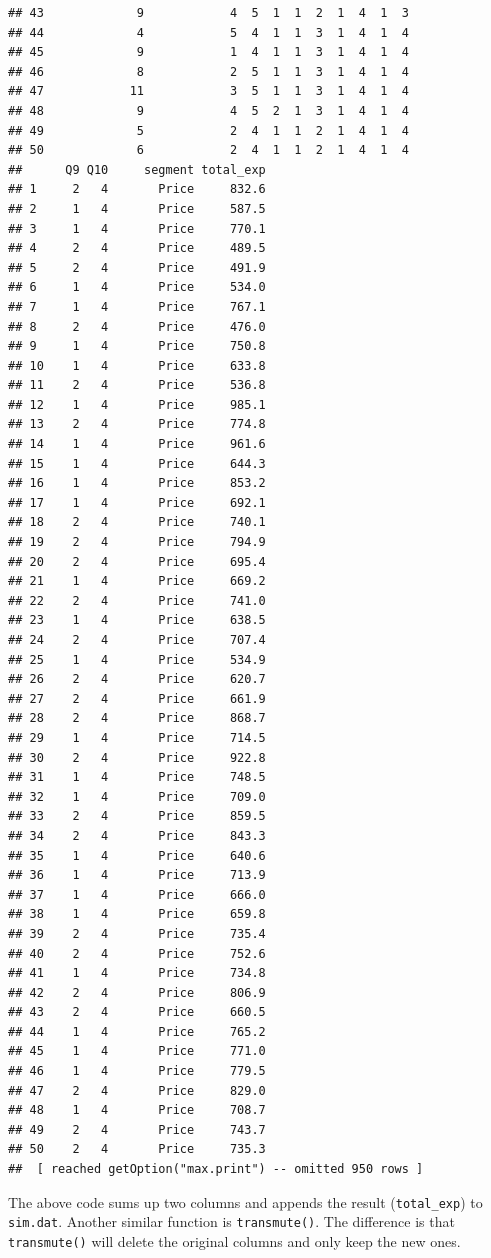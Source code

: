 \documentclass[12pt,]{krantz}
\theoremstyle{definition}
\theoremstyle{definition}
\theoremstyle{definition}
\theoremstyle{remark}
\begin{document}
\begin{verbatim}
## 43             9            4  5  1  1  2  1  4  1  3
## 44             4            5  4  1  1  3  1  4  1  4
## 45             9            1  4  1  1  3  1  4  1  4
## 46             8            2  5  1  1  3  1  4  1  4
## 47            11            3  5  1  1  3  1  4  1  4
## 48             9            4  5  2  1  3  1  4  1  4
## 49             5            2  4  1  1  2  1  4  1  4
## 50             6            2  4  1  1  2  1  4  1  4
##      Q9 Q10     segment total_exp
## 1     2   4       Price     832.6
## 2     1   4       Price     587.5
## 3     1   4       Price     770.1
## 4     2   4       Price     489.5
## 5     2   4       Price     491.9
## 6     1   4       Price     534.0
## 7     1   4       Price     767.1
## 8     2   4       Price     476.0
## 9     1   4       Price     750.8
## 10    1   4       Price     633.8
## 11    2   4       Price     536.8
## 12    1   4       Price     985.1
## 13    2   4       Price     774.8
## 14    1   4       Price     961.6
## 15    1   4       Price     644.3
## 16    1   4       Price     853.2
## 17    1   4       Price     692.1
## 18    2   4       Price     740.1
## 19    2   4       Price     794.9
## 20    2   4       Price     695.4
## 21    1   4       Price     669.2
## 22    2   4       Price     741.0
## 23    1   4       Price     638.5
## 24    2   4       Price     707.4
## 25    1   4       Price     534.9
## 26    2   4       Price     620.7
## 27    2   4       Price     661.9
## 28    2   4       Price     868.7
## 29    1   4       Price     714.5
## 30    2   4       Price     922.8
## 31    1   4       Price     748.5
## 32    1   4       Price     709.0
## 33    2   4       Price     859.5
## 34    2   4       Price     843.3
## 35    1   4       Price     640.6
## 36    1   4       Price     713.9
## 37    1   4       Price     666.0
## 38    1   4       Price     659.8
## 39    2   4       Price     735.4
## 40    2   4       Price     752.6
## 41    1   4       Price     734.8
## 42    2   4       Price     806.9
## 43    2   4       Price     660.5
## 44    1   4       Price     765.2
## 45    1   4       Price     771.0
## 46    1   4       Price     779.5
## 47    2   4       Price     829.0
## 48    1   4       Price     708.7
## 49    2   4       Price     743.7
## 50    2   4       Price     735.3
##  [ reached getOption("max.print") -- omitted 950 rows ]
\end{verbatim}

The above code sums up two columns and appends the result
(\texttt{total\_exp}) to \texttt{sim.dat}. Another similar function is
\texttt{transmute()}. The difference is that \texttt{transmute()} will
delete the original columns and only keep the new ones.
\end{document}
